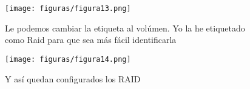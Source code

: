 \begin{figure}[H] %
	\centering
	\texttt{[image: figuras/figura13.png]}  %
	\label{figura13}
	
	\caption{Le podemos cambiar la etiqueta al volúmen. Yo la he etiquetado como Raid para que sea más fácil identificarla} 
\end{figure}
\begin{figure}[H] %
	\centering
	\texttt{[image: figuras/figura14.png]}  %
	\label{figura14}
	
	\caption{Y así quedan configurados los RAID} 
\end{figure}
